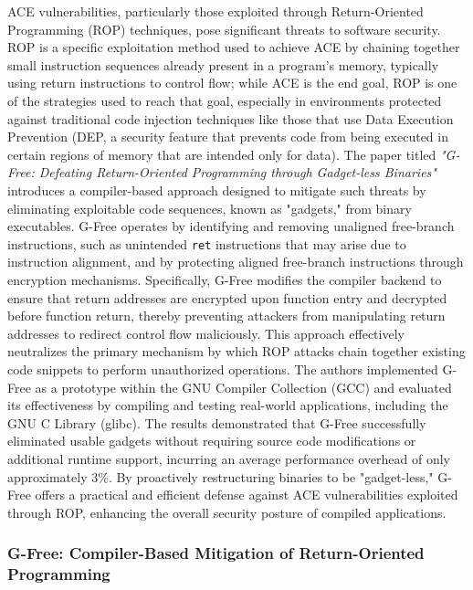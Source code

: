 \documentclass[a4paper]{usiinfbachelorproject}
\begin{document}
ACE vulnerabilities, particularly those exploited through Return-Oriented Programming (ROP) techniques, pose significant threats to software security. ROP is a specific exploitation method used to achieve ACE by chaining together small instruction sequences already present in a program’s memory, typically using return instructions to control flow; while ACE is the end goal, ROP is one of the strategies used to reach that goal, especially in environments protected against traditional code injection techniques like those that use Data Execution Prevention (DEP, a security feature that prevents code from being executed in certain regions of memory that are intended only for data). The paper titled \textit{"G-Free: Defeating Return-Oriented Programming through Gadget-less Binaries"} introduces a compiler-based approach designed to mitigate such threats by eliminating exploitable code sequences, known as "gadgets," from binary executables. G-Free operates by identifying and removing unaligned free-branch instructions, such as unintended \texttt{ret} instructions that may arise due to instruction alignment, and by protecting aligned free-branch instructions through encryption mechanisms. Specifically, G-Free modifies the compiler backend to ensure that return addresses are encrypted upon function entry and decrypted before function return, thereby preventing attackers from manipulating return addresses to redirect control flow maliciously. This approach effectively neutralizes the primary mechanism by which ROP attacks chain together existing code snippets to perform unauthorized operations. The authors implemented G-Free as a prototype within the GNU Compiler Collection (GCC) and evaluated its effectiveness by compiling and testing real-world applications, including the GNU C Library (glibc). The results demonstrated that G-Free successfully eliminated usable gadgets without requiring source code modifications or additional runtime support, incurring an average performance overhead of only approximately 3\%. By proactively restructuring binaries to be "gadget-less," G-Free offers a practical and efficient defense against ACE vulnerabilities exploited through ROP, enhancing the overall security posture of compiled applications.

\subsubsection{G-Free: Compiler-Based Mitigation of Return-Oriented Programming}
\end{document}
